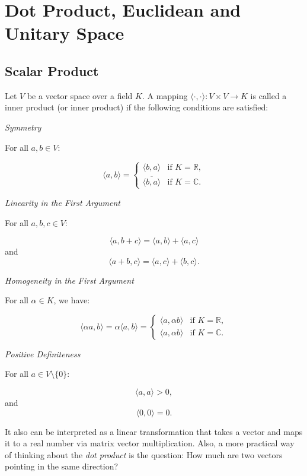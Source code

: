 \newpage
\section{Dot Product, Euclidean and Unitary Space}

\subsection{Scalar Product}

Let \(V\) be a vector space over a field \(K\). A mapping \(\langle \cdot, \cdot \rangle : V \times V \to K\) 
is called a inner product (or inner product) if the following conditions are satisfied:
\vspace{\baselineskip}

\emph{Symmetry}

For all \(a, b \in V\):

\[
\langle a, b \rangle = 
\begin{cases}
\langle b, a \rangle & \text{if } K = \mathbb{R}, \\
\overline{\langle b, a \rangle} & \text{if } K = \mathbb{C}.
\end{cases}
\]

\emph{Linearity in the First Argument}

For all \(a, b, c \in V\):

\[
\langle a, b + c \rangle = \langle a, b \rangle + \langle a, c \rangle
\]
and
\[
\langle a + b, c \rangle = \langle a, c \rangle + \langle b, c \rangle.
\]

\emph{Homogeneity in the First Argument}

For all \(\alpha \in K\), we have:

\[
\langle \alpha a, b \rangle = \alpha \langle a, b \rangle = 
\begin{cases}
\langle a, \alpha b \rangle & \text{if } K = \mathbb{R}, \\
\langle a, \alpha b \rangle & \text{if } K = \mathbb{C}.
\end{cases}
\]

\emph{Positive Definiteness}

For all \(a \in V \setminus \{0\}\):

\[
\langle a, a \rangle > 0,
\]
and
\[
\langle 0, 0 \rangle = 0.
\]

It also can be interpreted as a linear transformation that takes a vector and maps it to a real number via matrix 
vector multiplication. Also, a more practical way of thinking about the \emph{dot product} is the question: How 
much are two vectors pointing in the same direction?


